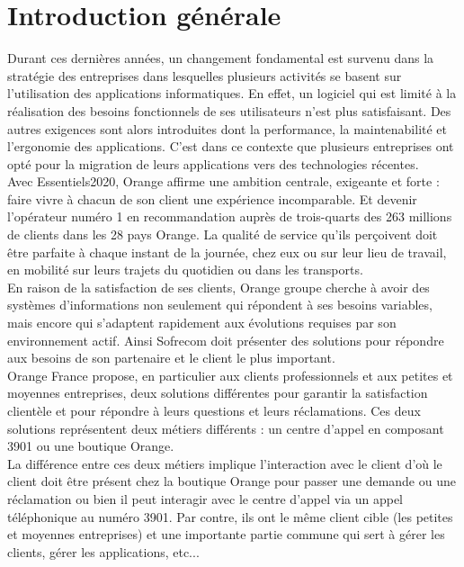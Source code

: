 \chapter*{Introduction générale}
Durant ces dernières années, un changement fondamental est survenu dans la stratégie des entreprises dans lesquelles plusieurs activités se basent sur l'utilisation des applications informatiques. En effet, un logiciel qui est limité à la réalisation des besoins fonctionnels de ses utilisateurs n'est plus satisfaisant. Des autres exigences sont alors introduites dont la performance, la maintenabilité et l'ergonomie des applications. C'est dans ce contexte que plusieurs entreprises ont opté pour la migration de leurs applications vers des technologies récentes.\\ \newline
Avec Essentiels2020\cite{essentiels2020}, Orange affirme une ambition centrale, exigeante et forte : faire vivre à chacun de son client une expérience incomparable. Et devenir l’opérateur numéro 1 en recommandation auprès de trois-quarts des 263 millions de clients dans les 28 pays Orange. La qualité de service qu’ils perçoivent doit être parfaite à chaque instant de la journée, chez eux ou sur leur lieu de travail, en mobilité sur leurs trajets du quotidien ou dans les transports.\\ \newline
En raison de la satisfaction de ses clients, Orange groupe cherche à avoir des systèmes d'informations non seulement qui répondent à ses besoins variables, mais encore qui s'adaptent rapidement aux évolutions requises par son environnement actif. Ainsi Sofrecom doit présenter des solutions pour répondre aux besoins de son partenaire et le client le plus important.\\ \newline
Orange France propose, en particulier aux clients professionnels et aux petites et moyennes entreprises, deux solutions différentes pour garantir la satisfaction clientèle et pour répondre à leurs questions et leurs réclamations. Ces deux solutions représentent deux métiers différents : un centre d’appel en composant 3901 ou une boutique Orange.\\ \newline
La différence entre ces deux métiers implique l’interaction avec le client d’où le client doit être présent chez la boutique Orange pour passer une demande ou une réclamation ou bien il peut interagir avec le centre d’appel  via un appel téléphonique au numéro 3901. Par contre, ils ont le même client cible (les petites et moyennes entreprises) et une importante partie commune qui sert à gérer les clients, gérer les applications, etc...
